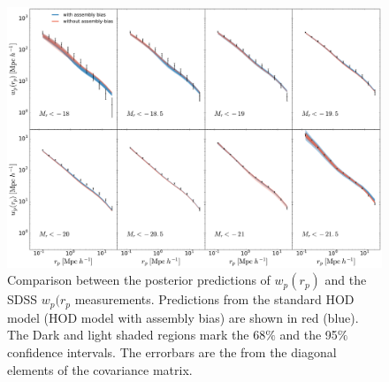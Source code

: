 \begin{figure}[p]~\\
\begin{center}
\includegraphics[width=\textwidth]{wpmodel.pdf}
\caption{Comparison between the posterior predictions of $w_{p}(r_{p})$ and the SDSS $w_{p}(r_{p}$ measurements. Predictions from the standard HOD model (HOD model with assembly bias) are shown in red (blue). The Dark and light shaded regions mark the 68$\%$ and the 95$\%$ confidence intervals. The errorbars are the from the diagonal elements of the covariance matrix.}
\label{fig:wpmodel}
\end{center}
\end{figure}
\clearpage
